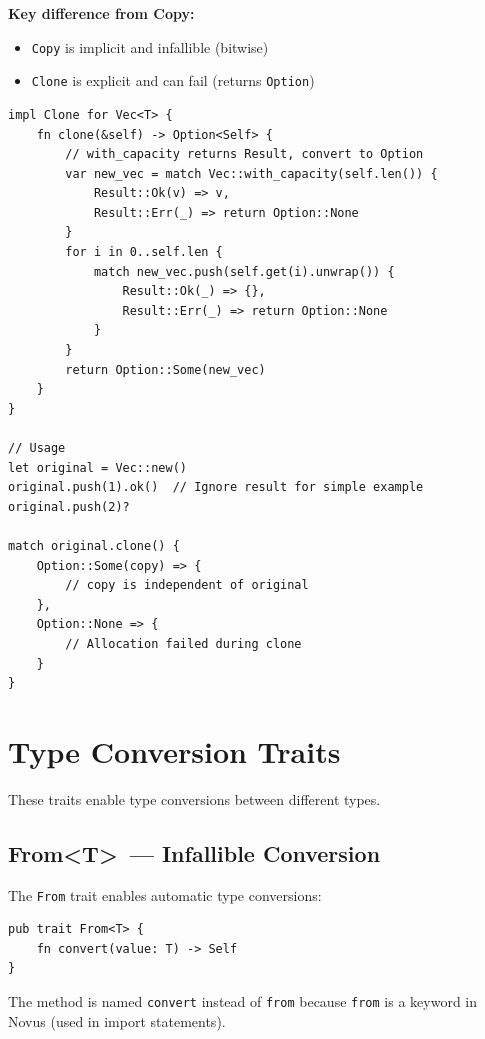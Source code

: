 \textbf{Key difference from Copy:}
\begin{itemize}
    \item \texttt{Copy} is implicit and infallible (bitwise)
    \item \texttt{Clone} is explicit and can fail (returns \texttt{Option})
\end{itemize}

\begin{lstlisting}
impl Clone for Vec<T> {
    fn clone(&self) -> Option<Self> {
        // with_capacity returns Result, convert to Option
        var new_vec = match Vec::with_capacity(self.len()) {
            Result::Ok(v) => v,
            Result::Err(_) => return Option::None
        }
        for i in 0..self.len {
            match new_vec.push(self.get(i).unwrap()) {
                Result::Ok(_) => {},
                Result::Err(_) => return Option::None
            }
        }
        return Option::Some(new_vec)
    }
}

// Usage
let original = Vec::new()
original.push(1).ok()  // Ignore result for simple example
original.push(2)?

match original.clone() {
    Option::Some(copy) => {
        // copy is independent of original
    },
    Option::None => {
        // Allocation failed during clone
    }
}
\end{lstlisting}

\section{Type Conversion Traits}
\label{sec:conversion-traits}

These traits enable type conversions between different types.

\subsection{From\textless T\textgreater\ --- Infallible Conversion}

The \texttt{From} trait enables automatic type conversions:

\begin{lstlisting}
pub trait From<T> {
    fn convert(value: T) -> Self
}
\end{lstlisting}

\begin{notebox}
The method is named \texttt{convert} instead of \texttt{from} because \texttt{from} is a keyword in Novus (used in import statements).
\end{notebox}

